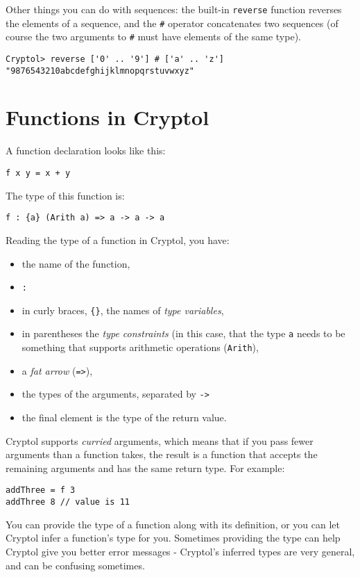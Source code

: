\documentclass[9pt,letter]{article}
\begin{document}
Other things you can do with sequences: the built-in \verb+reverse+ function reverses the elements of a sequence, and the \verb+#+ operator concatenates two sequences (of course the two arguments to \verb+#+ must have elements of the same type).
\begin{verbatim}
Cryptol> reverse ['0' .. '9'] # ['a' .. 'z']
"9876543210abcdefghijklmnopqrstuvwxyz"
\end{verbatim}

\section{Functions in Cryptol}
A function declaration looks like this:
\begin{verbatim}
f x y = x + y
\end{verbatim}
The type of this function is:
\begin{verbatim}
f : {a} (Arith a) => a -> a -> a
\end{verbatim}
Reading the type of a function in Cryptol, you have:
\begin{itemize}
\item{the name of the function, }
\item{\verb+:+}
\item{in curly braces, \verb+{}+, the names of {\em type variables}, }
\item{in parentheses the {\em type constraints} (in this case, that the type \verb+a+ needs to be something that supports arithmetic operations (\verb+Arith+),}
\item{a {\em fat arrow} (\verb+=>+),}
\item{the types of the arguments, separated by \verb+->+}
\item{the final element is the type of the return value.}
\end{itemize}

Cryptol supports {\em curried} arguments, which means that if you pass fewer arguments than a function takes, the result is a function that accepts the remaining arguments and has the same return type. For example:
\begin{verbatim}
addThree = f 3
addThree 8 // value is 11
\end{verbatim}

You can provide the type of a function along with its definition, or you can let Cryptol infer a function's type for you. Sometimes providing the type can help Cryptol give you better error messages - Cryptol's inferred types are very general, and can be confusing sometimes.
\end{document}
